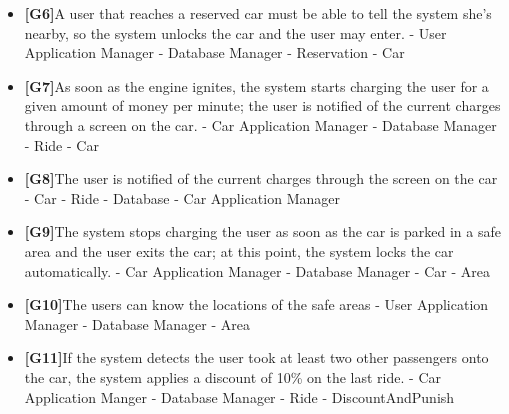 \documentclass{article}
\begin{document}
\begin{itemize}
		\item\textbf{[G6]}A user that reaches a reserved car must be able to tell the system she’s nearby, so the system unlocks the car and the user may enter.
		\newline - User Application Manager
		\newline - Database Manager
		\newline - Reservation
		\newline - Car
		
		\item\textbf{[G7]}As soon as the engine ignites, the system starts charging the user for a given amount of money per minute; the user is notified of the current charges through a screen on the car.
		\newline - Car Application Manager
		\newline - Database Manager
		\newline - Ride
		\newline - Car
		
		\item\textbf{[G8]}The user is notified of the current charges through the screen on the car
		\newline - Car
		\newline - Ride
		\newline - Database
		\newline - Car Application Manager
				
		\item\textbf{[G9]}The system stops charging the user as soon as the car is parked in a safe area and the user exits the car; at this point, the system locks the car automatically.
		\newline - Car Application Manager 
		\newline - Database Manager
		\newline - Car
		\newline - Area
		
		\item\textbf{[G10]}The users can know the locations of the safe areas
		\newline - User Application Manager
		\newline - Database Manager
		\newline - Area
		
		\item\textbf{[G11]}If the system detects the user took at least two other passengers onto the car, the system applies a discount of 10\% on the last ride.
		\newline - Car Application Manger 
		\newline - Database Manager 
		\newline - Ride
		\newline - DiscountAndPunish
				

\end{itemize}
\end{document}
